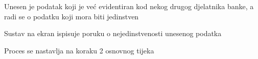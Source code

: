 \begin{packed_item}
\begin{packed_item}
							
							\item[4.b] Unesen je podatak koji je već evidentiran kod nekog drugog djelatnika banke, a radi se o podatku koji mora biti jedinstven
							\begin{packed_enum}
								\item Sustav na ekran ispisuje poruku o nejedinstvenosti unesenog podatka
								\item Proces se nastavlja na koraku 2 osnovnog tijeka
							\end{packed_enum}
							
						\end{packed_item}
						
					\end{packed_item}
					
					\noindent {}
